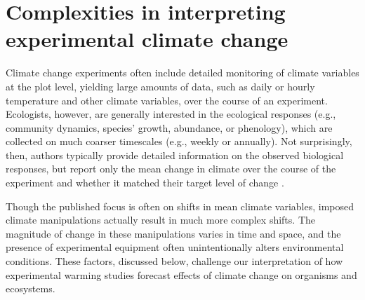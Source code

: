\documentclass{article}
\begin{document}
\section* {Complexities in interpreting experimental climate change} 
Climate change experiments often include detailed monitoring of climate variables at the plot level, yielding large amounts of data, such as daily or hourly temperature and other climate variables, over the course of an experiment. Ecologists, however, are generally interested in the ecological responses (e.g., community dynamics, species' growth, abundance, or phenology), which are collected on much coarser timescales (e.g., weekly or annually). Not surprisingly, then, authors typically provide detailed information on the observed biological responses, but report only the mean change in climate over the course of the experiment and whether it matched their target level of change \citep[e.g.,][]{price1998,rollinson2012,clark2014a,clark2014b}. 

\par Though the published focus is often on shifts in mean climate variables, imposed climate manipulations actually result in much more complex shifts. The magnitude of change in these manipulations varies in time and space, and the presence of experimental equipment often unintentionally alters environmental conditions. These factors, discussed below, challenge our interpretation of how experimental warming studies forecast effects of climate change on organisms and ecosystems.
\end{document}
